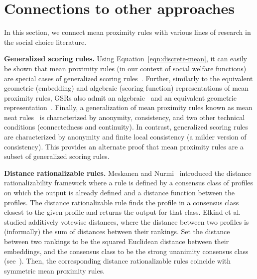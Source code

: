 \documentclass[prodmode]{acmsmall-ec14}
\begin{document}

\section{Connections to other approaches}
\label{sec:connection}
In this section, we connect mean proximity rules with various lines of research in the social choice literature. 

\medskip 
\noindent \textbf{Generalized scoring rules.} Using Equation~\eqref{eqn:discrete-mean}, it can easily be shown that mean proximity rules (in our context of social welfare functions) are special cases of generalized scoring rules~\cite{XC08}. Further, similarly to the equivalent geometric (embedding) and algebraic (scoring function) representations of mean proximity rules, GSRs also admit an algebraic~\cite{XC08} and an equivalent geometric representation~\cite{MPR12b,CPS14}. Finally, a generalization of mean proximity rules known as mean neat rules~\cite{Zwicker08b} is characterized by anonymity, consistency, and two other technical conditions (connectedness and continuity). In contrast, generalized scoring rules are characterized by anonymity and finite local consistency (a milder version of consistency). This provides an alternate proof that mean proximity rules are a subset of generalized scoring rules. 

\medskip
\noindent \textbf{Distance rationalizable rules.} Meskanen and Nurmi~ introduced the distance rationalizability framework where a rule is defined by a consensus class of profiles on which the output is already defined and a distance function between the profiles. The distance rationalizable rule finds the profile in a consensus class closest to the given profile and returns the output for that class. Elkind et al.~ studied additively votewise distances, where the distance between two profiles is (informally) the sum of distances between their rankings. Set the distance between two rankings to be the squared Euclidean distance between their embeddings, and the consensus class to be the strong unanimity consensus class (see~\cite{EFS10}). Then, the corresponding distance rationalizable rules coincide with symmetric mean proximity rules. 
\end{document}
